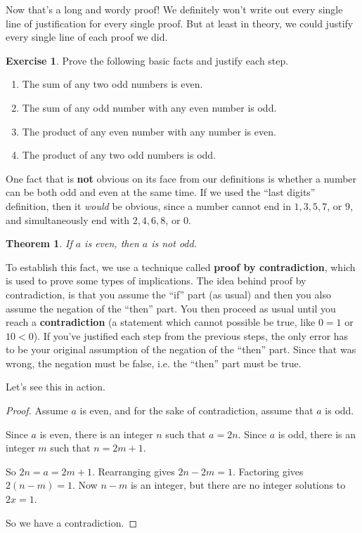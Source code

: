 \documentclass[11pt]{article}
\newtheorem{thm}{Theorem}
\theoremstyle{definition}
\newtheorem{exercise}{Exercise}
\numberwithin{thm}{section}
\begin{document}
Now that's a long and wordy proof! We definitely won't write out every single line of justification for every single proof. But at least in theory, we could justify every single line of each proof we did.

\begin{exercise} Prove the following basic facts and justify each step.
\begin{enumerate}
	\item The sum of any two odd numbers is even.
    \item The sum of any odd number with any even number is odd.
    \item The product of any even number with any number is even.
    \item The product of any two odd numbers is odd.
\end{enumerate}
\end{exercise}

One fact that is \textbf{not} obvious on its face from our definitions is whether a number can be both odd and even at the same time. If we used the ``last digits'' definition, then it \textit{would} be obvious, since a number cannot end in $1,3,5,7$, or $9$, and simultaneously end with $2,4,6,8$, or $0$.

\begin{thm} If $a$ is even, then $a$ is not odd.
\end{thm}

To establish this fact, we use a technique called \textbf{proof by contradiction}, which is used to prove some types of implications. The idea behind proof by contradiction, is that you assume the ``if'' part (as usual) and then you also assume the negation of the ``then'' part. You then proceed as usual until you reach a \textbf{contradiction} (a statement which cannot possible be true, like $0 = 1$ or $10 < 0$). If you've justified each step from the previous steps, the only error has to be your original assumption of the negation of the ``then'' part. Since that was wrong, the negation must be false, i.e. the ``then'' part must be true.

Let's see this in action.

\begin{proof} Assume $a$ is even, and for the sake of contradiction, assume that $a$ is odd.

Since $a$ is even, there is an integer $n$ such that $a = 2n$. Since $a$ is odd, there is an integer $m$ such that $n = 2m + 1$.

So $2n = a = 2m+1$. Rearranging gives $2n - 2m = 1$. Factoring gives $2(n-m) = 1$. Now $n-m$ is an integer, but there are no integer solutions to $2x = 1$.

So we have a contradiction.
\end{proof}
\end{document}

